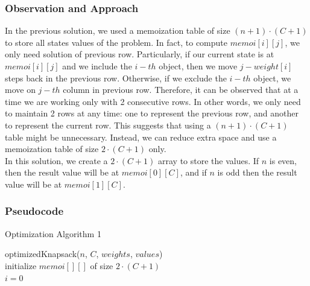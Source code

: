 \documentclass{article}
\begin{document}
\subsubsection{Observation and Approach}
In the previous solution, we used a memoization table of size $(n+1) \cdot (C+1)$ to store all states values of the problem. In fact, to compute $memoi[i][j]$, we only need solution of previous row. Particularly, if our current state is at $memoi[i][j]$ and we include the $i-th$ object, then we move $j-weight[i]$ steps back in the previous row. Otherwise, if we exclude the $i-th$ object, we move on $j-th$ column in previous row. Therefore, it can be observed that at a time we are working only with 2 consecutive rows. In other words, we only need to maintain 2 rows at any time: one to represent the previous row, and another to represent the current row. This suggests that using a $(n+1) \cdot (C+1)$ table might be unnecessary. Instead, we can reduce extra space and use a memoization table of size $2 \cdot (C+1)$ only. \\
\indent In this solution, we create a  $2 \cdot (C+1)$ array to store the values. If $n$ is even, then the result value will be at $memoi[0][C]$, and if $n$ is odd then the result value will be at $memoi[1][C]$. 

\subsubsection{Pseudocode}
\begin{algorithm}[H]
\caption{Optimization Algorithm 1}
\SetAlgoLined
{}
optimizedKnapsack($n$, $C$, $weights$, $values$) \\
initialize $memoi[][]$ of size $2 \cdot (C+1)$\; \\
$i = 0$\; \\
\end{algorithm}
\end{document}
